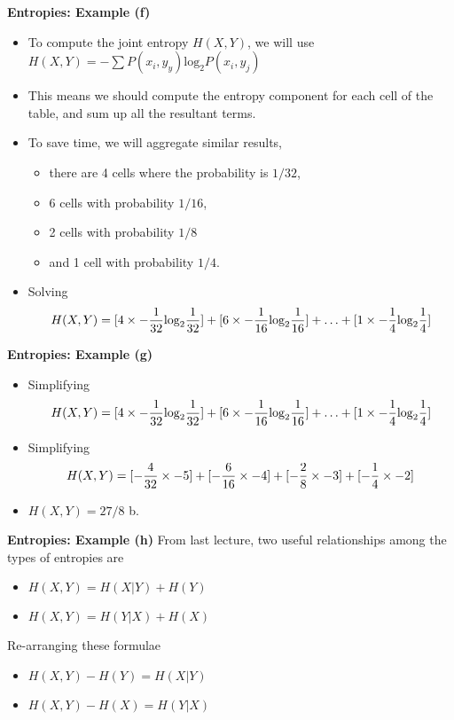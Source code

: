 \documentclass[a4]{beamer}
\begin{document}
\noindent \textbf{Entropies: Example (f)}
\begin{itemize}

\item To compute the joint entropy $H(X,Y)$,  we will use $H(X,Y) = -\sum P(x_i,y_y) \mbox{log}_2P(x_i,y_j)$
\bigskip
\item This means we should compute the entropy component for each cell of the table, and sum up all the resultant terms.
\bigskip
\item To save time, we will aggregate similar results, \begin{itemize} \item there are 4 cells where the probability is $1/32$,\item 6 cells with probability $1/16$, \item 2 cells with probability $1/8$ \item and 1 cell with probability $1/4$. \end{itemize}
\item Solving
\[ H(X,Y) = [4 \times -{1\over 32} \mbox{log}_2 {1\over 32} ] + [6 \times -{1\over 16} \mbox{log}_2 {1\over 16} ] + \ldots + [1 \times -{1\over 4} \mbox{log}_2 {1\over 4} ] \]
\end{itemize}



\noindent \textbf{Entropies: Example (g)}
\begin{itemize}
\item Simplifying\[ H(X,Y) = [4 \times -{1\over 32} \mbox{log}_2 {1\over 32} ] + [6 \times -{1\over 16} \mbox{log}_2 {1\over 16} ] + \ldots + [1 \times -{1\over 4} \mbox{log}_2 {1\over 4} ] \]
\item Simplifying \[H(X,Y) = [-{4\over 32} \times -5 ] + [-{6\over 16} \times -4 ] + [-{2\over 8} \times -3 ] + [ -{1\over 4} \times -2]\]
\item $H(X,Y) = 27/8$ b.
\end{itemize}



\noindent \textbf{Entropies: Example (h)}
From last lecture, two useful relationships among the types of entropies are
\begin{itemize}
\item $H(X,Y)=H(X|Y)+H(Y) $
\item $H(X,Y)=H(Y|X)+H(X) $
\end{itemize}
\bigskip
Re-arranging these formulae
\begin{itemize}
\item $H(X,Y)-H(Y) = H(X|Y) $
\item $H(X,Y)-H(X) = H(Y|X) $
\end{itemize}
\end{document}
